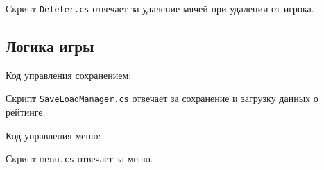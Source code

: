 Скрипт \texttt{Deleter.cs} отвечает за удаление мячей при удалении от игрока.

\subsection{Логика игры}

Код управления сохранением:


Скрипт \texttt{SaveLoadManager.cs} отвечает за сохранение и загрузку данных о рейтинге.

Код управления меню:


Скрипт \texttt{menu.cs} отвечает за меню.


